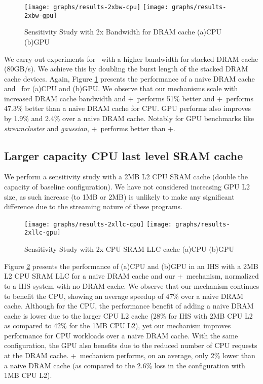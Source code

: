 \begin{figure}[!htb]
	\centering
	\texttt{[image: graphs/results-2xbw-cpu]}
	\texttt{[image: graphs/results-2xbw-gpu]}
	\caption{Sensitivity Study with 2x Bandwidth for DRAM cache (a)CPU (b)GPU}
	\label{results-ddr3-2133}
\end{figure}

We carry out experiments for \cachename\ with a higher bandwidth for stacked DRAM cache (80GB/s). We achieve this by doubling the burst length of the stacked DRAM cache devices. Again, Figure \ref{results-ddr3-2133}  presents the performance of a naive DRAM cache and \cachename\ for (a)CPU and (b)GPU. We observe that our mechanisms scale with increased DRAM cache bandwidth and \bypassname+\prioname\ performs 51\% better and \chaining+\prioname\ performs 47.3\% better than a naive DRAM cache for CPU. GPU performs also improves by 1.9\% and 2.4\% over a naive DRAM cache. Notably for GPU benchmarks like \textit{streamcluster} and \textit{gaussian}, \chaining+\prioname\ performs better than \bypassname+\prioname.

\subsection{Larger capacity CPU last level SRAM cache}
We perform a sensitivity study with a 2MB L2 CPU SRAM cache (double the capacity of baseline configuration). We have not considered increasing GPU L2 size, as such increase (to 1MB or 2MB) is unlikely to make any significant difference due to the streaming nature of these programs.

\begin{figure}[!htb]
	\centering
	\texttt{[image: graphs/results-2xllc-cpu]}
	\texttt{[image: graphs/results-2xllc-gpu]}
	\caption{Sensitivity Study with 2x CPU SRAM LLC cache (a)CPU (b)GPU}
	\label{results-2mb-llc}
\end{figure}

\par Figure \ref{results-2mb-llc} presents the performance of (a)CPU and (b)GPU in an IHS with a 2MB L2 CPU SRAM LLC for a naive DRAM cache and our \bypassname+\prioname\ mechanism, normalized to a IHS system with no DRAM cache. We observe that our mechanism continues to benefit the CPU, showing an average speedup of 47\% over a naive DRAM cache. Although for the CPU, the performance benefit of adding a naive DRAM cache is lower due to the larger CPU L2 cache (28\% for IHS with 2MB CPU L2 as compared to 42\% for the 1MB CPU L2), yet our mechanism improves performance for CPU workloads over a naive DRAM cache. With the same configuration, the GPU also benefits due to the reduced number of CPU requests at the DRAM cache. \bypassname+\prioname\ mechanism performs, on an average, only 2\% lower than a naive DRAM cache (as compared to the 2.6\% loss in the configuration with 1MB CPU L2).

